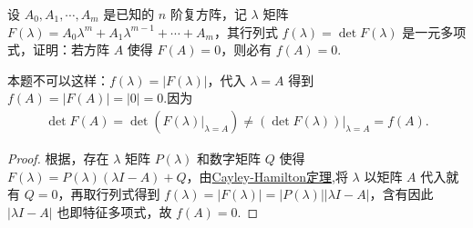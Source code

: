 \documentclass[../../main.tex]{subfiles}%
\begin{document}
\begin{example}
设 $A_0,A_1,\cdots,A_m$ 是已知的 $n$ 阶复方阵，记 $\lambda$ 矩阵 $F(\lambda)=A_0\lambda^m + A_1\lambda^{m - 1} + \cdots + A_m$，其行列式 $f(\lambda)=\det F(\lambda)$ 是一元多项式，证明：若方阵 $A$ 使得 $F(A)=0$，则必有 $f(A)=0$.
\end{example}
\begin{remark}
本题不可以这样：$f(\lambda)=|F(\lambda)|$，代入 $\lambda = A$ 得到 $f(A)=|F(A)|=|0|=0$.因为
\begin{align*}
\det F\left( A \right) =\det \left( F\left( \lambda \right) |_{\lambda =A} \right) \ne \left( \det F\left( \lambda \right) \right) |_{\lambda =A}=f\left( A \right) .
\end{align*}
\end{remark}
\begin{proof}

根据，存在 $\lambda$ 矩阵 $P(\lambda)$ 和数字矩阵 $Q$ 使得 $F(\lambda)=P(\lambda)(\lambda I - A)+Q$，由\hyperref[theorem:Cayley-Hamilton定理]{Cayley-Hamilton定理},将 $\lambda$ 以矩阵 $A$ 代入就有 $Q = 0$，再取行列式得到 $f(\lambda)=|F(\lambda)|=|P(\lambda)||\lambda I - A|$，含有因此 $|\lambda I - A|$ 也即特征多项式，故 $f(A)=0.$

\end{proof}
\end{document}
